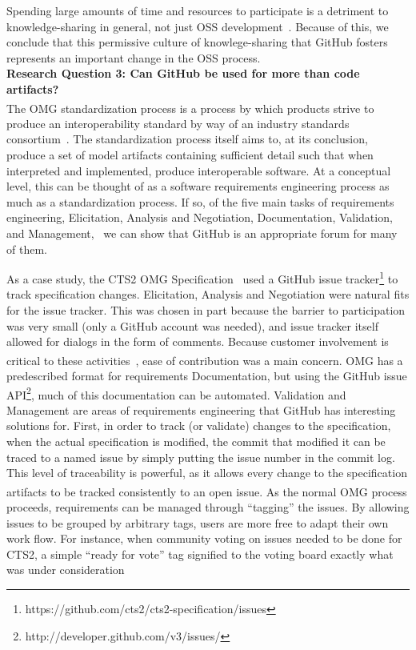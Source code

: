 \documentclass{proc}
\begin{document}
{{{{{Spending large amounts of time and resources to participate is a detriment to knowledge-sharing in general, not just OSS development~\cite{ardichvili2003motivation}. Because of this, we conclude that this permissive culture of knowlege-sharing that GitHub fosters represents an important change in the OSS process.\\

\noindent \textbf{Research Question 3: Can GitHub be used for more than code artifacts?}\\
The OMG\textsuperscript{\textregistered} standardization process is a process by which products strive to produce an interoperability standard by way of an industry standards consortium~\cite{omgTechProcess}.
The standardization process itself aims to, at its conclusion, produce a set of model artifacts containing sufficient detail such that when interpreted and implemented, produce interoperable software.
At a conceptual level, this can be thought of as a software requirements engineering process as much as a standardization process. If so, of the five main tasks of requirements engineering, Elicitation, Analysis and Negotiation, Documentation, Validation, and Management,~\cite{sommerville1998requirements} we can show that GitHub is an appropriate forum for many of them.

As a case study, the CTS2 OMG\textsuperscript{\textregistered} Specification~\cite{cts2} used a GitHub issue tracker\footnote{https://github.com/cts2/cts2-specification/issues} to track specification changes. Elicitation, Analysis and Negotiation were natural fits for the issue tracker. This was chosen in part because the barrier to participation was very small (only a GitHub account was needed), and issue tracker itself allowed for dialogs in the form of comments. Because customer involvement is critical to these activities~\cite{paetsch2003requirements}, ease of contribution was a main concern. OMG\textsuperscript{\textregistered} has a predescribed format for requirements Documentation, but using the GitHub issue API\footnote{http://developer.github.com/v3/issues/}, much of this documentation can be automated.
Validation and Management are areas of requirements engineering that GitHub has interesting solutions for. First, in order to track (or validate) changes to the specification, when the actual specification is modified, the commit that modified it can be traced to a named issue by simply putting the issue number in the commit log. This level of traceability is powerful, as it allows every change to the specification artifacts to be tracked consistently to an open issue. As the normal OMG\textsuperscript{\textregistered} process proceeds, requirements can be managed through ``tagging'' the issues. By allowing issues to be grouped by arbitrary tags, users are more free to adapt their own work flow. For instance, when community voting on issues needed to be done for CTS2, a simple ``ready for vote'' tag signified to the voting board exactly what was under consideration

}}}}}
\end{document}
